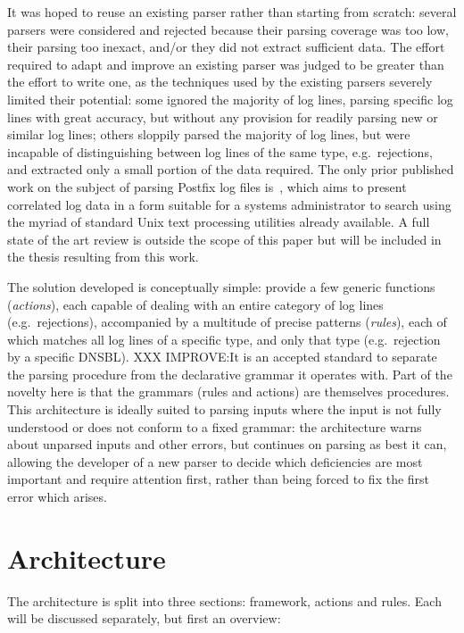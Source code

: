 \documentclass[draft]{svmult}
\begin{document}
It was hoped to reuse an existing parser rather than starting from scratch:
several parsers were considered and rejected because their parsing coverage
was too low, their parsing too inexact, and/or they did not extract
sufficient data.  The effort required to adapt and improve an existing
parser was judged to be greater than the effort to write one, as the
techniques used by the existing parsers severely limited their potential:
some ignored the majority of log lines, parsing specific log lines with
great accuracy, but without any provision for readily parsing new or
similar log lines; others sloppily parsed the majority of log lines, but
were incapable of distinguishing between log lines of the same type, e.g.\
rejections, and extracted only a small portion of the data required.  The only
prior published work on the subject of parsing Postfix log files
is~\cite{log-mail-analyser}, which aims to present correlated log data in a
form suitable for a systems administrator to search using the myriad of
standard Unix text processing utilities already available.  A full state of
the art review is outside the scope of this paper but will be included in
the thesis resulting from this work.

The solution developed is conceptually simple: provide a few generic
functions (\textit{actions\/}), each capable of dealing with an entire
category of log lines (e.g.\ rejections), accompanied by a multitude of
precise patterns (\textit{rules\/}), each of which matches all log lines of
a specific type, and only that type (e.g.\ rejection by a specific DNSBL).
XXX IMPROVE:\@ It is an accepted standard to separate the parsing procedure
from the declarative grammar it operates with.  Part of the novelty here is
that the grammars (rules and actions) are themselves procedures.  This
architecture is ideally suited to parsing inputs where the input is not
fully understood or does not conform to a fixed grammar: the architecture
warns about unparsed inputs and other errors, but continues on parsing as
best it can, allowing the developer of a new parser to decide which
deficiencies are most important and require attention first, rather than
being forced to fix the first error which arises.

\section{Architecture}

\label{Architecture}

The architecture is split into three sections: framework, actions and
rules.  Each will be discussed separately, but first an overview:
\end{document}
